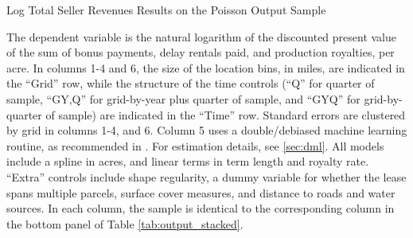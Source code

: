 \documentclass[12pt]{article}
\begin{document}
\begin{appendices}
\begin{table}[H]
	\begin{center}
	\begin{threeparttable}
		\caption{Log Total Seller Revenues Results on the Poisson Output Sample}
		\label{tab:tableParcelLeases}
		\small
		            
		\begin{tablenotes}
		\footnotesize
		\item The dependent variable is the natural logarithm of the discounted present value of the sum of bonus payments, delay rentals paid, and production royalties, per acre. In columns 1-4 and 6, the size of the location bins, in miles, are indicated in the ``Grid'' row, while the structure of the time controls (``Q'' for quarter of sample, ``GY,Q'' for grid-by-year plus quarter of sample, and ``GYQ'' for grid-by-quarter of sample) are indicated in the ``Time'' row.  Standard errors are clustered by grid in columns 1-4, and 6.  Column 5 uses a double/debiased machine learning routine, as recommended in  \cite{chernozhukov2018double}.  For estimation details, see \ref{sec:dml}.  All models include a spline in acres, and linear terms in term length and royalty rate.  ``Extra'' controls include shape regularity, a dummy variable for whether the lease spans multiple parcels, surface cover measures, and distance to roads and water sources.  In each column, the sample is identical to the corresponding column in the bottom panel of Table \ref{tab:output_stacked}. 
		\end{tablenotes}
	\end{threeparttable}
	\end{center}
\end{table}


\end{appendices}
\end{document}
